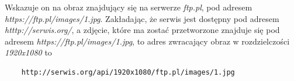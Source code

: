 Wskazuje on na obraz znajdujący się na serwerze \textit{ftp.pl}, pod adresem \textit{https://ftp.pl/images/1.jpg}.
\newline
Zakładając, że serwis jest dostępny pod adresem \textit{htttp://serwis.org/}, a zdjęcie, które ma zostać przetworzone znajduje się pod adresem \textit{https://ftp.pl/images/1.jpg}, to adres zwracający obraz w rozdzielczości \textit{1920x1080} to
\newline
\begin{verbatim}
	http://serwis.org/api/1920x1080/ftp.pl/images/1.jpg
\end{verbatim}

